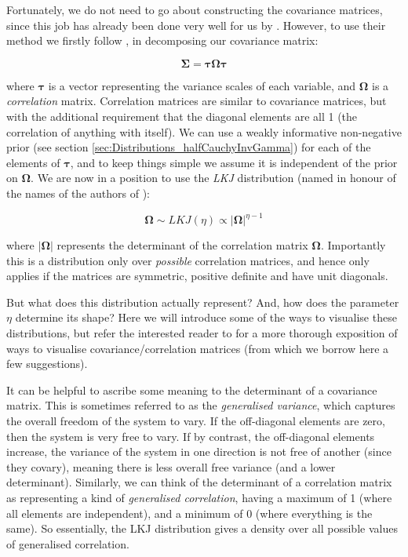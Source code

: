 \documentclass[11pt,fullpage]{book}
\begin{document}
Fortunately, we do not need to go about constructing the covariance matrices, since this job has already been done very well for us by \cite{lewandowski2009generating}. However, to use their method we firstly follow \cite{stan-manual:2015}, in decomposing our covariance matrix:

\begin{equation}
\boldsymbol{\Sigma} = \boldsymbol{\tau}\boldsymbol{\Omega}\boldsymbol{\tau}
\end{equation}

where $\boldsymbol{\tau}$ is a vector representing the variance scales of each variable, and $\boldsymbol{\Omega}$ is a \textit{correlation} matrix. Correlation matrices are similar to covariance matrices, but with the additional requirement that the diagonal elements are all 1 (the correlation of anything with itself). We can use a weakly informative non-negative prior (see section \ref{sec:Distributions_halfCauchyInvGamma}) for each of the elements of $\boldsymbol{\tau}$, and to keep things simple we assume it is independent of the prior on $\boldsymbol{\Omega}$. We are now in a position to use the \textit{LKJ} distribution (named in honour of the names of the authors of \cite{lewandowski2009generating}):

\begin{equation}
\boldsymbol{\Omega} \sim LKJ(\eta) \propto |\boldsymbol{\Omega}|^{\eta-1}
\end{equation}

where $|\boldsymbol{\Omega}|$ represents the determinant of the correlation matrix $\boldsymbol{\Omega}$. Importantly this is a distribution only over \textit{possible} correlation matrices, and hence only applies if the matrices are symmetric, positive definite and have unit diagonals.

But what does this distribution actually represent? And, how does the parameter $\eta$ determine its shape? Here we will introduce some of the ways to visualise these distributions, but refer the interested reader to \cite{tokuda2011visualizing} for a more thorough exposition of ways to visualise covariance/correlation matrices (from which we borrow here a few suggestions). 

It can be helpful to ascribe some meaning to the determinant of a covariance matrix. This is sometimes referred to as the \textit{generalised variance}, which captures the overall freedom of the system to vary. If the off-diagonal elements are zero, then the system is very free to vary. If by contrast, the off-diagonal elements increase, the variance of the system in one direction is not free of another (since they covary), meaning there is less overall free variance (and a lower determinant). Similarly, we can think of the determinant of a correlation matrix as representing a kind of \textit{generalised correlation}, having a maximum of 1 (where all elements are independent), and a minimum of 0 (where everything is the same). So essentially, the LKJ distribution gives a density over all possible values of generalised correlation. 
\end{document}
